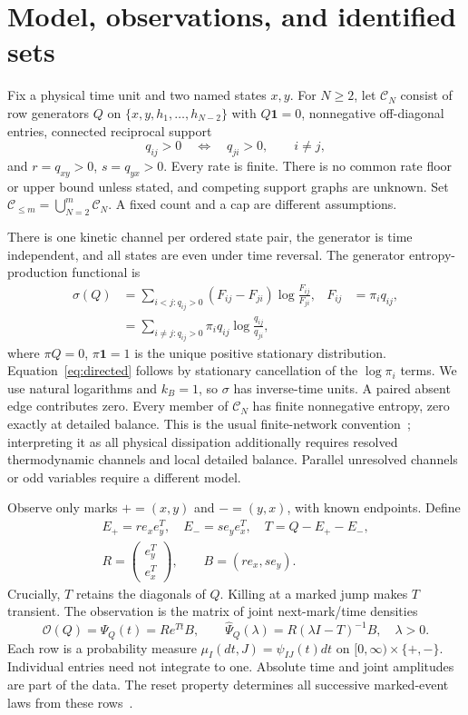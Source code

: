 \documentclass[aps,pre,onecolumn,11pt,longbibliography,notitlepage]{revtex4-2}
\newcommand{\1}{\mathbf 1}
\newcommand{\C}{\mathcal C}
\newcommand{\Obs}{\mathcal O}
\newcommand{\sig}{\sigma}
\begin{document}
\section{Model, observations, and identified sets}\label{sec:model}
Fix a physical time unit and two named states $x,y$. For $N\ge2$, let $\C_N$ consist of row generators $Q$ on $\{x,y,h_1,\ldots,h_{N-2}\}$ with $Q\1=0$, nonnegative off-diagonal entries, connected reciprocal support
\begin{equation}
 q_{ij}>0\quad\Longleftrightarrow\quad q_{ji}>0,\qquad i\ne j,
\end{equation}
and $r=q_{xy}>0$, $s=q_{yx}>0$. Every rate is finite. There is no common rate floor or upper bound unless stated, and competing support graphs are unknown. Set $\C_{\le m}=\bigcup_{N=2}^m\C_N$. A fixed count and a cap are different assumptions.

There is one kinetic channel per ordered state pair, the generator is time independent, and all states are even under time reversal. The generator entropy-production functional is
\begin{align}
 \sig(Q)&=\sum_{i<j:q_{ij}>0}(F_{ij}-F_{ji})\log\frac{F_{ij}}{F_{ji}},
 &F_{ij}&=\pi_iq_{ij},\label{eq:entropy}\\
 &=\sum_{i\ne j:q_{ij}>0}\pi_iq_{ij}\log\frac{q_{ij}}{q_{ji}},\label{eq:directed}
\end{align}
where $\pi Q=0$, $\pi\1=1$ is the unique positive stationary distribution. Equation~\eqref{eq:directed} follows by stationary cancellation of the $\log\pi_i$ terms. We use natural logarithms and $k_B=1$, so $\sig$ has inverse-time units. A paired absent edge contributes zero. Every member of $\C_N$ has finite nonnegative entropy, zero exactly at detailed balance. This is the usual finite-network convention~\cite{Schnakenberg1976,NishiyamaHasegawa2023}; interpreting it as all physical dissipation additionally requires resolved thermodynamic channels and local detailed balance. Parallel unresolved channels or odd variables require a different model.

Observe only marks $+=(x,y)$ and $-=(y,x)$, with known endpoints. Define
\begin{gather}
 E_+=r e_xe_y^T,\quad E_-=s e_ye_x^T,\quad T=Q-E_+-E_-,\\
 R=\begin{pmatrix}e_y^T\\e_x^T\end{pmatrix},\qquad B=(r e_x,s e_y).
\end{gather}
Crucially, $T$ retains the diagonals of $Q$. Killing at a marked jump makes $T$ transient. The observation is the matrix of joint next-mark/time densities
\begin{equation}
 \Obs(Q)=\Psi_Q(t)=R e^{Tt}B,\qquad
 \widehat\Psi_Q(\lambda)=R(\lambda I-T)^{-1}B,\quad\lambda>0.\label{eq:obs}
\end{equation}
Each row is a probability measure $\mu_I(dt,J)=\psi_{IJ}(t)dt$ on $[0,\infty)\times\{+,-\}$. Individual entries need not integrate to one. Absolute time and joint amplitudes are part of the data. The reset property determines all successive marked-event laws from these rows~\cite{vanDerMeer2022,Harunari2022}.
\end{document}
